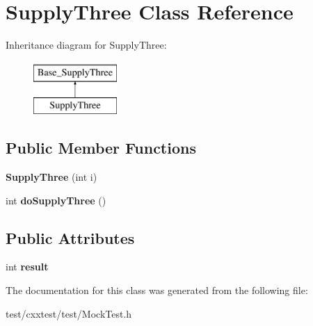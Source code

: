 \hypertarget{classSupplyThree}{\section{Supply\-Three Class Reference}
\label{classSupplyThree}
}
Inheritance diagram for Supply\-Three\-:\begin{figure}[H]
\begin{center}
\leavevmode
\includegraphics[height=2.000000cm]{classSupplyThree}
\end{center}
\end{figure}
\subsection*{Public Member Functions}
\begin{DoxyCompactItemize}
\item 
\hypertarget{classSupplyThree_ac4e4107895bfb46360aa7a723f42d3c9}{{\bfseries Supply\-Three} (int i)}\label{classSupplyThree_ac4e4107895bfb46360aa7a723f42d3c9}

\item 
\hypertarget{classSupplyThree_a5a9047aceceb8654e0b993caa68163cb}{int {\bfseries do\-Supply\-Three} ()}\label{classSupplyThree_a5a9047aceceb8654e0b993caa68163cb}

\end{DoxyCompactItemize}
\subsection*{Public Attributes}
\begin{DoxyCompactItemize}
\item 
\hypertarget{classSupplyThree_a9129dc7bad69ce9b4a0b78a802769773}{int {\bfseries result}}\label{classSupplyThree_a9129dc7bad69ce9b4a0b78a802769773}

\end{DoxyCompactItemize}


The documentation for this class was generated from the following file\-:\begin{DoxyCompactItemize}
\item 
test/cxxtest/test/Mock\-Test.\-h\end{DoxyCompactItemize}
